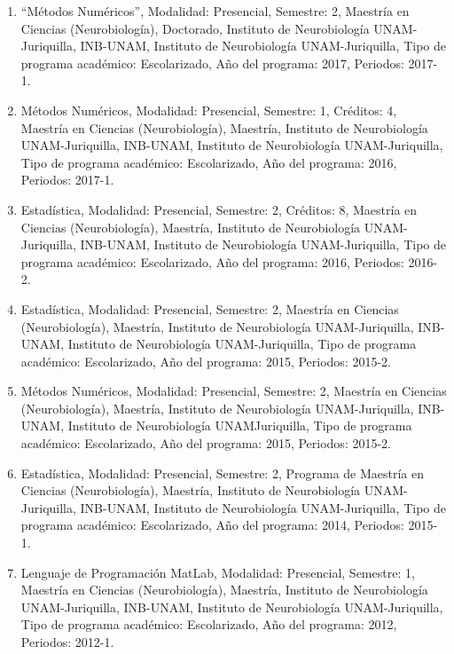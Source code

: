 \begin{enumerate}
\item “Métodos Numéricos”, Modalidad: Presencial, Semestre: 2, Maestría en Ciencias (Neurobiología), 
Doctorado, 
Instituto de Neurobiología UNAM-Juriquilla, INB-UNAM, Instituto de Neurobiología UNAM-Juriquilla, Tipo de 
programa académico: Escolarizado, Año del programa: 2017, Periodos: 2017-1.

\item Métodos Numéricos, Modalidad: Presencial, Semestre: 1, Créditos: 4, Maestría en Ciencias 
(Neurobiología), 
Maestría, Instituto de Neurobiología UNAM-Juriquilla, INB-UNAM, Instituto de Neurobiología UNAM-Juriquilla, 
Tipo de programa académico: Escolarizado, Año del programa: 2016, Periodos: 2017-1.

\item Estadística, Modalidad: Presencial, Semestre: 2, Créditos: 8, Maestría en Ciencias (Neurobiología), 
Maestría, 
Instituto de Neurobiología UNAM-Juriquilla, INB-UNAM, Instituto de Neurobiología UNAM-Juriquilla, Tipo de 
programa académico: Escolarizado, Año del programa: 2016, Periodos: 2016-2.

\item Estadística, Modalidad: Presencial, Semestre: 2, Maestría en Ciencias (Neurobiología), Maestría, 
Instituto de 
Neurobiología UNAM-Juriquilla, INB-UNAM, Instituto de Neurobiología UNAM-Juriquilla, Tipo de programa 
académico: Escolarizado, Año del programa: 2015, Periodos: 2015-2.

\item Métodos Numéricos, Modalidad: Presencial, Semestre: 2, Maestría en Ciencias (Neurobiología), Maestría, 
Instituto de Neurobiología UNAM-Juriquilla, INB-UNAM, Instituto de Neurobiología UNAMJuriquilla, Tipo de 
programa académico: Escolarizado, Año del programa: 2015, Periodos: 2015-2.

\item Estadística, Modalidad: Presencial, Semestre: 2, Programa de Maestría en Ciencias (Neurobiología), 
Maestría, 
Instituto de Neurobiología UNAM-Juriquilla, INB-UNAM, Instituto de Neurobiología UNAM-Juriquilla, Tipo de 
programa académico: Escolarizado, Año del programa: 2014, Periodos: 2015-1.

\item Lenguaje de Programación MatLab, Modalidad: Presencial, Semestre: 1, Maestría en Ciencias 
(Neurobiología), 
Maestría, Instituto de Neurobiología UNAM-Juriquilla, INB-UNAM, Instituto de Neurobiología UNAM-Juriquilla, 
Tipo de programa académico: Escolarizado, Año del programa: 2012, Periodos: 2012-1.


\end{enumerate}
